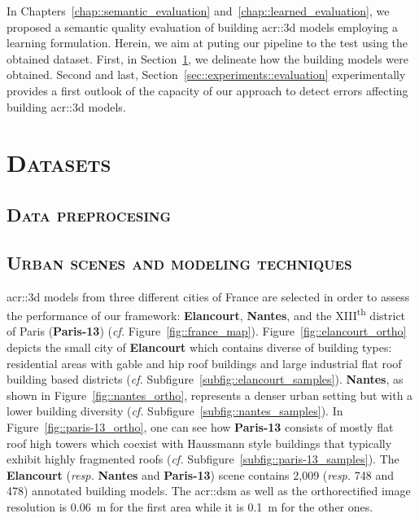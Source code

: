 \minitoc

\vfill

In Chapters~\ref{chap::semantic_evaluation} and~\ref{chap::learned_evaluation}, we proposed a semantic quality evaluation of building \gls{acr::3d} models employing a learning formulation.
Herein, we aim at puting our pipeline to the test using the obtained dataset.
First, in Section~\ref{sec::experiments::datasets}, we delineate how the building models were obtained.
Second and last, Section~\ref{sec::experiments::evaluation} experimentally provides a first outlook of the capacity of our approach to detect errors affecting building \gls{acr::3d} models.

\clearpage

\section{\textsc{Datasets}}
    \label{sec::experiments::datasets}
    
    \subsection{\textsc{Data preprocesing}}
        \label{subsec::experiments::datasets::preprocessing}

    \subsection{\textsc{Urban scenes and modeling techniques}}
        \label{subsec::experiments::datasets::scenes}
        \gls{acr::3d} models from three different cities of France are selected in order to assess the performance of our framework: \textbf{Elancourt}, \textbf{Nantes}, and the XIII\textsuperscript{th} district of Paris (\textbf{Paris-13}) (\textit{cf.} Figure~\ref{fig::france_map}).
        Figure~\ref{fig::elancourt_ortho} depicts the small city of \textbf{Elancourt} which contains diverse of building types: residential areas with gable and hip roof buildings and large industrial flat roof building based districts (\textit{cf.} Subfigure~\ref{subfig::elancourt_samples}).
        \textbf{Nantes}, as shown in Figure~\ref{fig::nantes_ortho}, represents a denser urban setting but with a lower building diversity (\textit{cf.} Subfigure~\ref{subfig::nantes_samples}).
        In Figure~\ref{fig::paris-13_ortho}, one can see how \textbf{Paris-13} consists of mostly flat roof high towers which coexist with Haussmann style buildings that typically exhibit highly fragmented roofs (\textit{cf.} Subfigure~\ref{subfig::paris-13_samples}).
        The \textbf{Elancourt} (\textit{resp.} \textbf{Nantes} and \textbf{Paris-13}) scene contains 2,009 (\textit{resp.} 748 and 478) annotated building models.
        The \gls{acr::dsm} as well as the orthorectified image resolution is \SI{0.06}{\m} for the first area while it is \SI{0.1}{\m} for the other ones.

